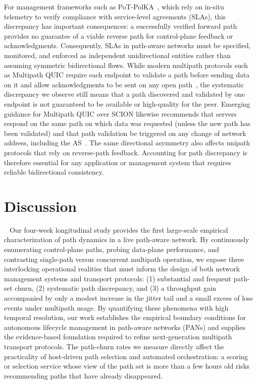 \documentclass[pdflatex,sn-vancouver-num]{sn-jnl}%
\theoremstyle{thmstyleone}%
\theoremstyle{thmstyletwo}%
\theoremstyle{thmstylethree}%
\begin{document}
For management frameworks such as PoT-PolKA~\cite{borges2024pot}, which rely on in-situ telemetry to verify compliance with service-level agreements (SLAs), this discrepancy has important consequences: a successfully verified forward path provides no guarantee of a viable reverse path for control-plane feedback or acknowledgments. Consequently, SLAs in path-aware networks must be specified, monitored, and enforced as independent unidirectional entities rather than assuming symmetric bidirectional flows.
% 
While modern multipath protocols such as Multipath QUIC require each endpoint to validate a path before sending data on it and allow acknowledgments to be sent on any open path~\cite[Sections~3.1 and~5.4]{ietf-quic-multipath-15}, the systematic discrepancy we observe still means that a path discovered and validated by one endpoint is not guaranteed to be available or high-quality for the peer. Emerging guidance for Multipath QUIC over SCION likewise recommends that servers respond on the same path on which data was requested (unless the new path has been validated) and that path validation be triggered on any change of network address, including the AS~\cite[Sections~5.1 and~6.3]{zaeschke-scion-quic-multipath-01}. The same directional asymmetry also affects unipath protocols that rely on reverse-path feedback. Accounting for path discrepancy is therefore essential for any application or management system that requires reliable bidirectional consistency.

\section{Discussion}~\label{sec::discussion}
Our four-week longitudinal study provides the first large-scale empirical characterization of path dynamics in a live path-aware network. By continuously enumerating control-plane paths, probing data-plane performance, and contrasting single-path versus concurrent multipath operation, we expose three interlocking operational realities that must inform the design of both network management systems and transport protocols: (1) substantial and frequent path-set churn, (2) systematic path discrepancy, and (3) a throughput gain accompanied by only a modest increase in the jitter tail and a small excess of loss events under multipath usage. By quantifying these phenomena with high temporal resolution, our work establishes the empirical boundary conditions for autonomous lifecycle management in path-aware networks (PANs) and supplies the evidence-based foundation required to refine next-generation multipath transport protocols. The path-churn rates we measure directly affect the practicality of host-driven path selection and automated orchestration: a scoring or selection service whose view of the path set is more than a few hours old risks recommending paths that have already disappeared.
\end{document}
